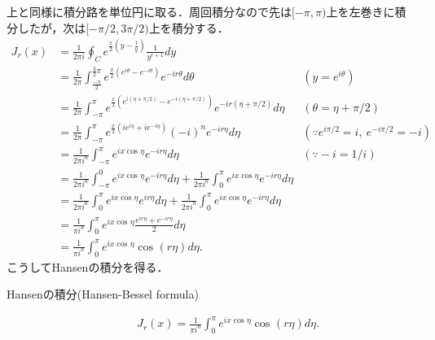 \documentclass[a4j,papersize,disablejfam,slide,14pt]{jsarticle}
\def\cos#1#2{\operatorname{cos}^{#2} #1} %
\def\exp#1{e^{#1}} %
\begin{document}
    上と同様に積分路を単位円に取る．周回積分なので先は$[-\pi, \pi)$上を左巻きに積分したが，次は$[-\pi/2, 3\pi/2)$上を積分する．
    \begin{align}
    	J_r(x) &= \frac{1}{2 \pi i}\oint_{C} \exp{\frac{x}{2}\left( y - \frac{1}{y} \right)} \frac{1}{y^{r+1}} dy \\
        &= \frac{1}{2 \pi} \int_{\frac{-\pi}{2}}^{\frac{3}{2}\pi} \exp{\frac{x}{2} (\exp{i\theta} - \exp{-i\theta})} \exp{-ir\theta} d\theta & (y = \exp{i\theta}) \\
        &= \frac{1}{2 \pi} \int_{-\pi}^{\pi} \exp{\frac{x}{2} (\exp{i(\eta+\pi/2)} - \exp{-i(\eta+\pi/2)})} \exp{-ir(\eta+\pi/2)} d\eta & (\theta = \eta + \pi/2) \\
        &= \frac{1}{2 \pi} \int_{-\pi}^{\pi} \exp{\frac{x}{2} (i\exp{i\eta} + i\exp{-i\eta})} (-i)^n \exp{-ir\eta} d\eta & (\because \exp{i\pi/2} = i,\ \exp{-i\pi/2} = -i) \\
        &= \frac{1}{2 \pi i^n} \int_{-\pi}^{\pi} \exp{ix\cos{\eta}{}} \exp{-ir\eta} d\eta & (\because -i = 1/i) \\
        &= \frac{1}{2 \pi i^n} \int_{-\pi}^{0} \exp{ix\cos{\eta}{}} \exp{-ir\eta} d\eta 
        	+ \frac{1}{2 \pi i^n} \int_{0}^{\pi} \exp{ix\cos{\eta}{}} \exp{-ir\eta} d\eta \\
        &= \frac{1}{2 \pi i^n} \int_{0}^{\pi} \exp{ix\cos{\eta}{}} \exp{ir\eta} d\eta 
        	+  \frac{1}{2 \pi i^n} \int_{0}^{\pi} \exp{ix\cos{\eta}{}} \exp{-ir\eta} d\eta \\
        &= \frac{1}{\pi i^n} \int_{0}^{\pi} \exp{ix\cos{\eta}{}} \frac{\exp{ir\eta} + \exp{-ir\eta}}{2} d\eta \\
        &= \frac{1}{\pi i^n} \int_{0}^{\pi} \exp{ix\cos{\eta}{}} \cos{(r\eta)}{} d\eta.
    \end{align}
    こうして{\rm Hansen}の積分を得る．
    \begin{screen}
    	\begin{description}
        	\item[{\rm Hansen}の積分({\rm Hansen-Bessel formula})]
            \begin{align}
            	J_r(x) = \frac{1}{\pi i^n} \int_{0}^{\pi} \exp{ix\cos{\eta}{}} \cos{(r\eta)}{} d\eta.
            \end{align}
        \end{description}
    \end{screen}
    
\end{document}
